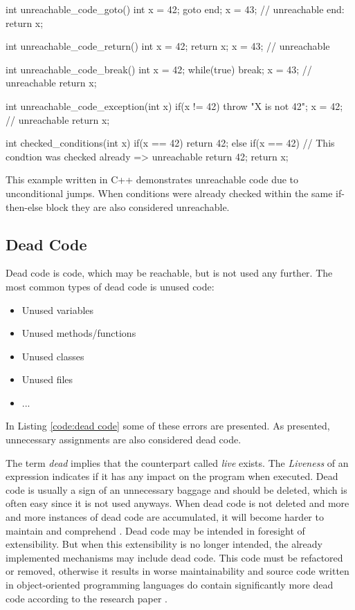 \begin{program}[h!]
	\begin{CppCode}
		int unreachable_code_goto() {
			int x = 42;
			goto end;
			x = 43; // unreachable
			end: return x;
		}
		
		int unreachable_code_return() {
			int x = 42;
			return x;
			x = 43; // unreachable
		}
		
		int unreachable_code_break() {
			int x = 42;
			while(true) {
				break;
				x = 43; // unreachable
			}
			return x;
		}
		
		int unreachable_code_exception(int x) {
			if(x != 42) {
				throw "X is not 42";
				x = 42; // unreachable
			}
			return x;
		}
		
		int checked_conditions(int x) {
			if(x == 42) {
				return 42;
			} else if(x == 42) { // This condtion was checked already => unreachable
				return 42;
			}
			return x;
	}\end{CppCode}
	\caption{This example written in C++ demonstrates unreachable code due to unconditional jumps. When conditions were already checked within the same if-then-else block they are also considered unreachable.}
	\label{code:unconditional unreachable code}
\end{program}


\subsection{Dead Code}
\label{sub:dead code}

Dead code is code, which may be reachable, but is not used any further.
The most common types of dead code is unused code:
\begin{itemize}
	\item Unused variables \cite{Prahofer_2012}
	\item Unused methods/functions \cite{Romano_2016}
	\item Unused classes
	\item Unused files \cite{Boomsma_2012}
	\item ...
\end{itemize}
In Listing \ref{code:dead code} some of these errors are presented. As presented, unnecessary assignments are also considered dead code.


The term \emph{dead} implies that the counterpart called \emph{live} exists. 
The \emph{Liveness} of an expression indicates if it has any impact on the program when executed.
Dead code is usually a sign of an unnecessary baggage and should be deleted, which is often easy since it is not used anyways.
When dead code is not deleted and more and more instances of dead code are accumulated, it will become harder to maintain and comprehend \cite{Romano_2020}. Dead code may be intended in foresight of extensibility. But when this extensibility is no longer intended, the already implemented mechanisms may include dead code. This code must be refactored or removed, otherwise it results in worse maintainability and 
source code written in object-oriented programming languages do contain significantly more dead code according to the research paper \cite{Srivastava_1992}.


